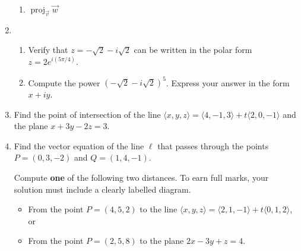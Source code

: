\documentclass[12pt]{article}
\newcommand{\points}[1]{\marginpar{\hspace{24pt}[#1]}}
\begin{document}
\begin{enumerate}
\begin{enumerate}
 \item $\operatorname{proj}_{\vec{v}}\vec{w}$ \points{4}
\end{enumerate}
\newpage

\item 
\begin{enumerate}
 \item Verify that $z=-\sqrt{2}-i\sqrt{2}$ can be written in the polar form $z=2e^{i(5\pi/4)}$. \points{3}

\vspace{2in}

 \item Compute the power $(-\sqrt{2}-i\sqrt{2})^5$. Express your answer in the form $x+iy$. \points{5}
\end{enumerate}

\vspace{3in}

\item Find the point of intersection of the line $\langle x,y,z\rangle = \langle 4, -1, 3\rangle+t\langle 2, 0, -1\rangle$ and the plane $x+3y-2z=3$. \points{4}

\newpage

\item Find the vector equation of the line $\ell$ that passes through the points $P=(0, 3, -2)$ and $Q=(1, 4, -1)$. \points{4}

\vspace{3in}

Compute \textbf{one} of the following two distances. \points{6} To earn full marks, your solution must include a clearly labelled diagram.
\begin{itemize}
\item From the point $P=(4, 5, 2)$ to the line $\langle x,y,z\rangle = \langle 2,1,-1\rangle + t\langle 0,1,2 \rangle$, or  
\item From the point $P=(2,5,8)$ to the plane $2x-3y+z=4$.
\end{itemize}




\end{enumerate}
\end{document}
